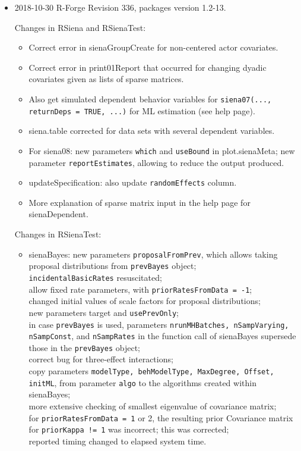 \documentclass[a4paper,fleqn,11pt]{article}
\newcommand{\+}{\, + \,}
\begin{document}
\begin{small}
\begin{itemize}
\item 2018-10-30 R-Forge Revision 336, packages version 1.2-13.

Changes in \textsf{RSiena} and \textsf{RSienaTest}:
\begin{itemize}
   \item Correct error in \textsf{sienaGroupCreate} for non-centered actor covariates.
   \item Correct error in \textsf{print01Report} that occurred for changing dyadic covariates
     given as lists of sparse matrices.
   \item Also get simulated dependent behavior variables for
     \texttt{siena07(..., returnDeps = TRUE, ...)} for ML estimation (see help page).
   \item \textsf{siena.table} corrected for data sets with several dependent variables.
   \item For \textsf{siena08}: new parameters \texttt{which} and \texttt{useBound}
   in \textsf{plot.sienaMeta};
     new parameter \texttt{reportEstimates}, allowing to reduce
     the output produced.
   \item \textsf{updateSpecification}: also update \texttt{randomEffects} column.
   \item More explanation of sparse matrix input in the help page for \textsf{sienaDependent}.
\end{itemize}

Changes in \textsf{RSienaTest}:
\begin{itemize}
   \item \textsf{sienaBayes}: new parameters \texttt{proposalFromPrev}, which allows
     taking proposal distributions from \texttt{prevBayes} object;\\
     \texttt{incidentalBasicRates} resuscitated;\\
     allow fixed rate parameters, with \texttt{priorRatesFromData = -1};\\
     changed initial values of scale factors for proposal distributions;\\
     new parameters target and \texttt{usePrevOnly};\\
     in case \texttt{prevBayes} is used, parameters \texttt{nrunMHBatches, nSampVarying, nSampConst},
     and \texttt{nSampRates} in the function call of \textsf{sienaBayes} supersede those
     in the \texttt{prevBayes} object;\\
     correct bug for three-effect interactions;\\
     copy parameters \texttt{modelType, behModelType, MaxDegree, Offset, initML},
     from parameter \texttt{algo} to the algorithms created within \textsf{sienaBayes};\\
     more extensive checking of smallest eigenvalue of covariance matrix;\\
     for \texttt{priorRatesFromData = 1} or 2, the resulting prior Covariance
     matrix for \texttt{priorKappa != 1}
     was incorrect; this was corrected;\\
     reported timing changed to elapsed system time.
\end{itemize}


\end{itemize}
\end{small}
\end{document}
